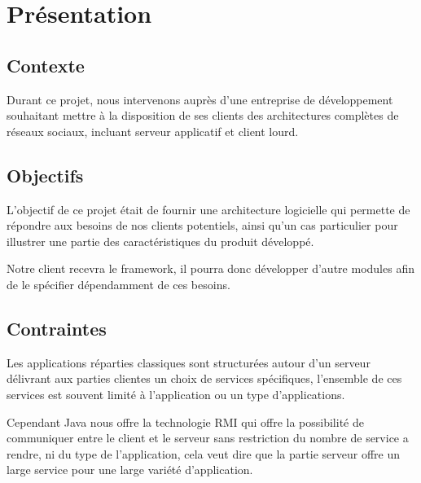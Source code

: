 
\section{Présentation}
\subsection{Contexte}
Durant ce projet, nous intervenons auprès d'une entreprise de développement souhaitant met\-tre à la disposition de ses clients des architectures complètes de réseaux sociaux, incluant serveur applicatif et client lourd.

\subsection{Objectifs}

L’objectif de ce projet était de fournir une architecture logicielle qui permette de répondre aux besoins de nos clients potentiels, ainsi qu’un cas particulier pour illustrer une partie des caractéristiques du produit développé.

Notre client recevra le framework, il pourra donc développer d’autre modules afin de le spécifier dépendamment de ces besoins.    

\subsection{Contraintes}
Les applications réparties classiques sont structurées autour d'un serveur délivrant aux parties clientes un choix de services spécifiques, l'ensemble de ces services est souvent limité à l'application ou un type d'applications.

Cependant Java nous offre la technologie RMI qui offre la possibilité de communiquer entre le client et le serveur sans restriction du nombre de service a rendre, ni du type de l’application, cela veut dire que la partie serveur offre un large service pour une large variété d’application.